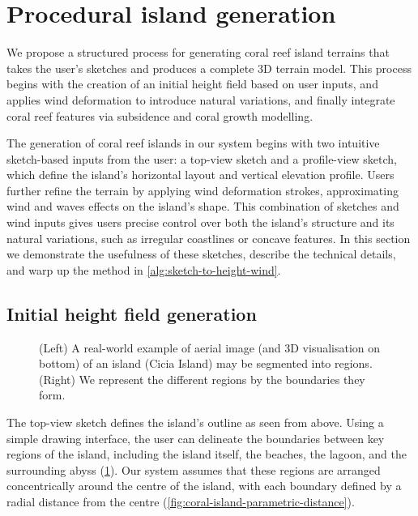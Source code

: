 \section{Procedural island generation}
\label{sec:coral-island-example-generation}

We propose a structured process for generating coral reef island terrains that takes the user's sketches and produces a complete 3D terrain model. This process begins with the creation of an initial height field based on user inputs, and applies wind deformation to introduce natural variations, and finally integrate coral reef features via subsidence and coral growth modelling.

The generation of coral reef islands in our system begins with two intuitive sketch-based inputs from the user: a top-view sketch and a profile-view sketch, which define the island's horizontal layout and vertical elevation profile. Users further refine the terrain by applying wind deformation strokes, approximating wind and waves effects on the island's shape. This combination of sketches and wind inputs gives users precise control over both the island's structure and its natural variations, such as irregular coastlines or concave features. In this section we demonstrate the usefulness of these sketches, describe the technical details, and warp up the method in \cref{alg:sketch-to-height-wind}.

\subsection{Initial height field generation}
\label{sec:coral-island-generation-initial}

\begin{figure}[H]
    \caption[A real island and its different regions]{(Left) A real-world example of aerial image (and 3D visualisation on bottom) of an island (Cicia Island) may be segmented into regions. (Right) We represent the different regions by the boundaries they form.}
    \label{fig:coral-island-top-view-sketch}
\end{figure}

The top-view sketch defines the island's outline as seen from above. Using a simple drawing interface, the user can delineate the boundaries between key regions of the island, including the island itself, the beaches, the lagoon, and the surrounding abyss (\cref{fig:coral-island-top-view-sketch}). Our system assumes that these regions are arranged concentrically around the centre of the island, with each boundary defined by a radial distance from the centre (\cref{fig:coral-island-parametric-distance}).

